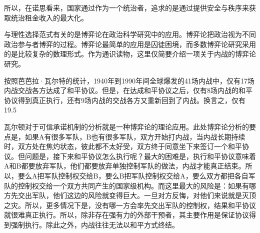 
所以，在诺思看来，国家通过作为一个统治者，追求的是通过提供安全与秩序来获取统治租金收入的最大化。

与理性选择范式有关的是博弈论在政治科学研究中的应用。博弈论把政治视为不同政治参与者博弈的过程。博弈论最简单的应用是囚徒困境，而多数博弈论研究采用的是比较复杂的数理形式。作为通识读物，这里仅简要介绍一项关于内战的博弈论研究。

按照芭芭拉·瓦尔特的统计，1940年到1990年间全球爆发的41场内战中，仅有17场内战交战各方达成了和平协议。但是，在达成和平协议之后，仅有8场内战的和平协议得到真正执行，还有9场内战的交战各方又重新回到了内战。换言之，仅有19.5%

瓦尔顿对于可信承诺机制的分析就是一种博弈论的理论应用。此处博弈论分析的要点是，如果A有很多军队，B也有很多军队，双方开始打内战，当内战长期持续时，双方处在焦灼状态，彼此都不太好受，双方终于同意坐下来签订一个和平协议。但问题是，接下来和平协议怎么执行呢？最大的困难是，执行和平协议意味着A和B都要放弃军队，他们都要放弃单独控制军队的做法，内战才能真正结束。所以，要么A把军队控制权交给B，要么B把军队控制权交给A，要么双方都把各自军队的控制权交给一个双方共同产生的国家级机构。而这里最大的风险是：如果有哪方先交出军队，他们这边的风险就变得巨大。一旦对方反悔，对他们来说就是灭顶之灾。所以，更多情况下是，没有哪一方会率先交出军队的控制权，结果和平协议就很难真正执行。所以，除非存在强有力的外部干预者，其主要作用是保证协议得到强制执行。除此之外，内战往往无法以和平方式终结。

